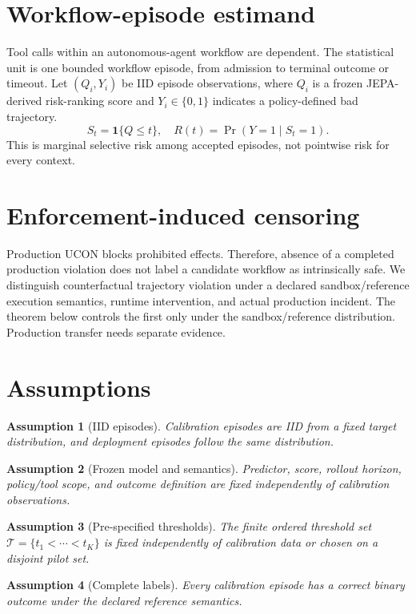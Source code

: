 \documentclass{article}
\newtheorem{assumption}{Assumption}[section]
\begin{document}
\section{Workflow-episode estimand}
Tool calls within an autonomous-agent workflow are dependent. The statistical unit is one bounded workflow episode, from admission to terminal outcome or timeout. Let $(Q_i,Y_i)$ be IID episode observations, where $Q_i$ is a frozen JEPA-derived risk-ranking score and $Y_i\in\{0,1\}$ indicates a policy-defined bad trajectory.
\[
S_t=\mathbf 1\{Q\le t\},\quad R(t)=\Pr(Y=1\mid S_t=1).
\]
This is marginal selective risk among accepted episodes, not pointwise risk for every context.
\section{Enforcement-induced censoring}
Production UCON blocks prohibited effects. Therefore, absence of a completed production violation does not label a candidate workflow as intrinsically safe. We distinguish counterfactual trajectory violation under a declared sandbox/reference execution semantics, runtime intervention, and actual production incident. The theorem below controls the first only under the sandbox/reference distribution. Production transfer needs separate evidence.
\section{Assumptions}
\begin{assumption}[IID episodes]\label{a:iid} Calibration episodes are IID from a fixed target distribution, and deployment episodes follow the same distribution.\end{assumption}
\begin{assumption}[Frozen model and semantics]\label{a:frozen} Predictor, score, rollout horizon, policy/tool scope, and outcome definition are fixed independently of calibration observations.\end{assumption}
\begin{assumption}[Pre-specified thresholds]\label{a:grid} The finite ordered threshold set $\mathcal T=\{t_1<\cdots<t_K\}$ is fixed independently of calibration data or chosen on a disjoint pilot set.\end{assumption}
\begin{assumption}[Complete labels]\label{a:labels} Every calibration episode has a correct binary outcome under the declared reference semantics.\end{assumption}
\end{document}
